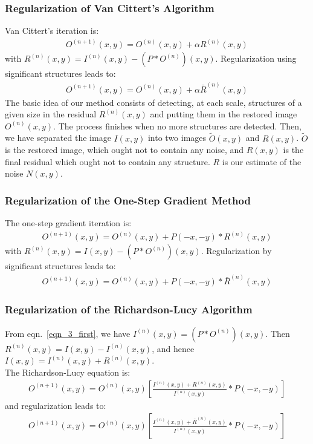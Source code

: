 \subsubsection{Regularization of Van Cittert's Algorithm}
 
Van Cittert's iteration \cite{rest:vancittert31} is:
\begin{eqnarray}
O^{(n+1)} (x,y) = O^{(n)} (x,y) + \alpha{R}^{(n)}(x,y) 
\end{eqnarray}
with ${R}^{(n)}(x,y) =  I^{(n)}(x,y) - (P * O^{(n)}) (x,y)$.
Regularization using significant structures leads to:
\begin{eqnarray}
O^{(n+1)} (x,y) = O^{(n)} (x,y) + \alpha {\bar{R}}^{(n)}(x,y) 
\end{eqnarray}
The basic idea of our method consists of detecting, at each scale,  
structures of a given size in
the residual $R^{(n)}(x,y)$ and putting them in the restored 
image $O^{(n)}(x,y)$. The
process finishes when no more structures are detected. Then, we have separated
the image $I(x,y)$ into two images $\tilde O(x,y)$ and $R(x,y)$.
 $\tilde O$ is the restored image, which ought not to contain any
noise, and  $R(x,y)$ is the final residual which ought  not to contain any 
structure. $R$ is our estimate of the noise $N(x,y)$.
 
\subsubsection{Regularization of the One-Step Gradient Method}
 
The one-step gradient iteration is:
\begin{eqnarray}
O^{(n+1)} (x,y) = O^{(n)} (x,y) + P(-x,-y) * {R}^{(n)}(x,y) 
\end{eqnarray}
with ${R}^{(n)}(x,y) = I(x,y) - (P * O^{(n)}) (x,y)$.
Regularization by significant structures leads to:
\begin{eqnarray}
O^{(n+1)} (x,y) = O^{(n)} (x,y) +  P(-x,-y) * {\bar{R}}^{(n)}(x,y)
\end{eqnarray}
 
\subsubsection{Regularization of the Richardson-Lucy Algorithm}

From eqn.\ \ref{eqn_3_first}, 
we have $I^{(n)}(x,y) =  (P * O^{(n)}) (x,y)$. Then
 $R^{(n)}(x,y) = I(x,y) - I^{(n)}(x,y) $, and 
hence $ I(x,y) = I^{(n)}(x,y) + R^{(n)}(x,y)$.\\
The Richardson-Lucy equation is:
\begin{eqnarray}
O^{(n+1)}(x,y) = O^{(n)}(x,y) [ \frac{I^{(n)}(x,y) + 
               R^{(n)}(x,y)}{I^{(n)}(x,y)} * P(-x,-y) ]
\end{eqnarray}
and regularization leads to: 
\begin{eqnarray}
O^{(n+1)}(x,y) = O^{(n)}(x,y) [ \frac{I^{(n)}(x,y) + 
               {\bar{R}}^{(n)}(x,y)}{I^{(n)}(x,y)} * P(-x,-y) ]
\end{eqnarray}
 
